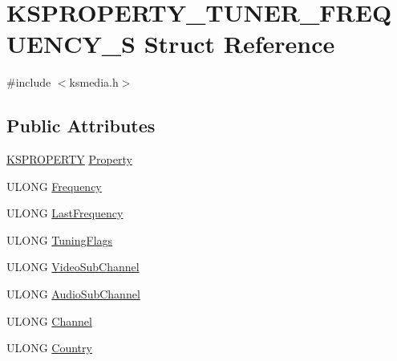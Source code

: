 \hypertarget{struct_k_s_p_r_o_p_e_r_t_y___t_u_n_e_r___f_r_e_q_u_e_n_c_y___s}{}\section{K\+S\+P\+R\+O\+P\+E\+R\+T\+Y\+\_\+\+T\+U\+N\+E\+R\+\_\+\+F\+R\+E\+Q\+U\+E\+N\+C\+Y\+\_\+S Struct Reference}
\label{struct_k_s_p_r_o_p_e_r_t_y___t_u_n_e_r___f_r_e_q_u_e_n_c_y___s}


{\ttfamily \#include $<$ksmedia.\+h$>$}

\subsection*{Public Attributes}
\begin{DoxyCompactItemize}
\item 
\hyperlink{ks_8h_a4392f77c74e868d813d46c39ada4d660}{K\+S\+P\+R\+O\+P\+E\+R\+TY} \hyperlink{struct_k_s_p_r_o_p_e_r_t_y___t_u_n_e_r___f_r_e_q_u_e_n_c_y___s_a9497b71ece9c65a3ceabb0eed8534bf5}{Property}
\item 
U\+L\+O\+NG \hyperlink{struct_k_s_p_r_o_p_e_r_t_y___t_u_n_e_r___f_r_e_q_u_e_n_c_y___s_aff49d98710f9c21f31762d8816f38e0e}{Frequency}
\item 
U\+L\+O\+NG \hyperlink{struct_k_s_p_r_o_p_e_r_t_y___t_u_n_e_r___f_r_e_q_u_e_n_c_y___s_a81eb32f796deb1338423d841d69f741d}{Last\+Frequency}
\item 
U\+L\+O\+NG \hyperlink{struct_k_s_p_r_o_p_e_r_t_y___t_u_n_e_r___f_r_e_q_u_e_n_c_y___s_a6517f868ad48b828a00cfe82fbcf9068}{Tuning\+Flags}
\item 
U\+L\+O\+NG \hyperlink{struct_k_s_p_r_o_p_e_r_t_y___t_u_n_e_r___f_r_e_q_u_e_n_c_y___s_a2303f094bba28a9e732222b4c7896478}{Video\+Sub\+Channel}
\item 
U\+L\+O\+NG \hyperlink{struct_k_s_p_r_o_p_e_r_t_y___t_u_n_e_r___f_r_e_q_u_e_n_c_y___s_a1c1e6a5761b33437a6c8a26817d08ae0}{Audio\+Sub\+Channel}
\item 
U\+L\+O\+NG \hyperlink{struct_k_s_p_r_o_p_e_r_t_y___t_u_n_e_r___f_r_e_q_u_e_n_c_y___s_ad2c7d0c4aea87d442e23b4abe633d41f}{Channel}
\item 
U\+L\+O\+NG \hyperlink{struct_k_s_p_r_o_p_e_r_t_y___t_u_n_e_r___f_r_e_q_u_e_n_c_y___s_aaa51519bc7fe86c8410e26711e9c26b2}{Country}
\end{DoxyCompactItemize}


